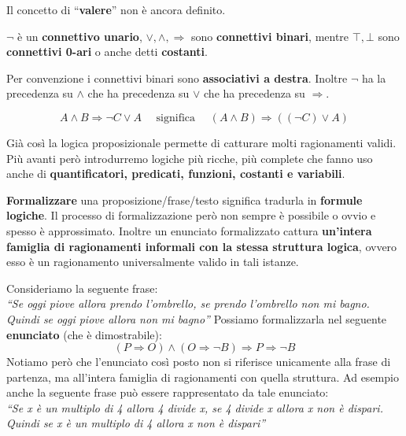 \documentclass[
  a4paper,
]{article}
\begin{document}
\begin{examplebox}[Nota]

Il concetto di ``\textbf{valere}'' non è ancora definito.

\end{examplebox}

\(\neg\) è un \textbf{connettivo unario}, \(\lor , \land , \Rightarrow\)
sono \textbf{connettivi binari}, mentre \(\top , \bot\) sono
\textbf{connettivi 0-ari} o anche detti \textbf{costanti}.

Per convenzione i connettivi binari sono \textbf{associativi a destra}.
Inoltre \(\neg\) ha la precedenza su \(\land\) che ha precedenza su
\(\lor\) che ha precedenza su \(\Rightarrow\).

\begin{examplebox}[Esempio]

\[
A \land B \Rightarrow \neg C \lor A \quad \text{ significa } \quad(A \land B) \Rightarrow ((\neg C) \lor A)
\]

\end{examplebox}

Già così la logica proposizionale permette di catturare molti
ragionamenti validi. Più avanti però introdurremo logiche più ricche,
più complete che fanno uso anche di \textbf{quantificatori, predicati,
funzioni, costanti e variabili}.

\textbf{Formalizzare} una proposizione/frase/testo significa tradurla in
\textbf{formule logiche}. Il processo di formalizzazione però non sempre
è possibile o ovvio e spesso è approssimato. Inoltre un enunciato
formalizzato cattura \textbf{un'intera famiglia di ragionamenti
informali con la stessa struttura logica}, ovvero esso è un ragionamento
universalmente valido in tali istanze.

\begin{examplebox}[Esempio]

Consideriamo la seguente frase:\\
\emph{``Se oggi piove allora prendo l'ombrello, se prendo l'ombrello non
mi bagno. Quindi se oggi piove allora non mi bagno''} Possiamo
formalizzarla nel seguente \textbf{enunciato} (che è dimostrabile): \[
(P \Rightarrow O) \land (O \Rightarrow \neg B) \Rightarrow P \Rightarrow \neg B
\] Notiamo però che l'enunciato così posto non si riferisce unicamente
alla frase di partenza, ma all'intera famiglia di ragionamenti con
quella struttura. Ad esempio anche la seguente frase può essere
rappresentato da tale enunciato:\\
\emph{``Se x è un multiplo di 4 allora 4 divide x, se 4 divide x allora
x non è dispari. Quindi se x è un multiplo di 4 allora x non è
dispari''}

\end{examplebox}
\end{document}
